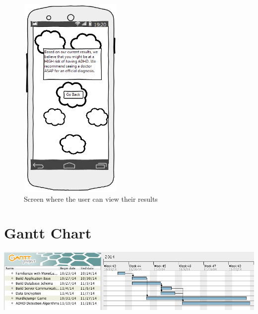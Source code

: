 \documentclass[a4wide]{article}
\begin{document}
\begin{figure}
\centering
\includegraphics[height=10cm, width = 5cm]{images/diagnosis_screen.png}
\caption{Screen where the user can view their results}
\label{fig:diagnosis_screen}
\end{figure}

\section{Gantt Chart}
\includegraphics[width=\textwidth]{images/Gantt.png}
\end{document}

